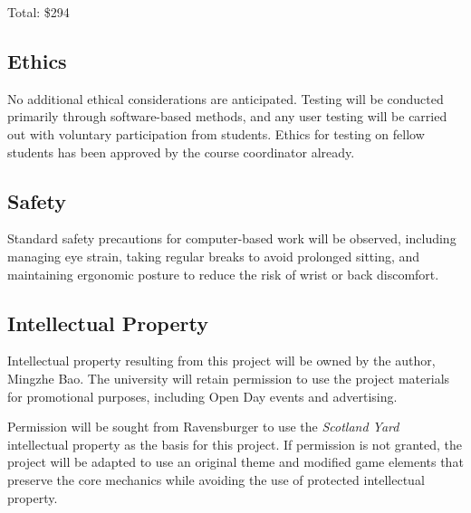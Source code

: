 \documentclass[11pt, a4paper, twoside, openright]{article}
\begin{document}
	Total: \$294
	
	\subsection{Ethics}
	
	No additional ethical considerations are anticipated. Testing will be conducted primarily through software-based methods, and any user testing will be carried out with voluntary participation from students. Ethics for testing on fellow students has been approved by the course coordinator already.
	
	\subsection{Safety}
	
	Standard safety precautions for computer-based work will be observed, including managing eye strain, taking regular breaks to avoid prolonged sitting, and maintaining ergonomic posture to reduce the risk of wrist or back discomfort.
	
	\subsection{Intellectual Property}
	
	Intellectual property resulting from this project will be owned by the author, Mingzhe Bao. The university will retain permission to use the project materials for promotional purposes, including Open Day events and advertising.
	
	Permission will be sought from Ravensburger to use the \textit{Scotland Yard} intellectual property as the basis for this project. If permission is not granted, the project will be adapted to use an original theme and modified game elements that preserve the core mechanics while avoiding the use of protected intellectual property.
	
\end{document}

